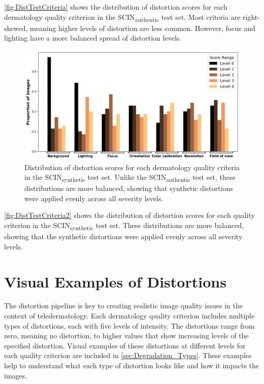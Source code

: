 \noindent
\clearpage
\autoref{fig:DistTestCriteria} shows the distribution of distortion scores for each dermatology quality criterion in the SCIN\textsubscript{authentic} test set. Most criteria are right-skewed, meaning higher levels of distortion are less common. However, focus and lighting have a more balanced spread of distortion levels.\par
\begin{figure}[ht]
    \centering
    \includegraphics[keepaspectratio,width=15cm]{img/Distribution_test_criteria2.png}
    \caption{Distribution of distortion scores for each dermatology quality criteria in the SCIN\textsubscript{synthetic} test set. Unlike the SCIN\textsubscript{authentic} test set, these distributions are more balanced, showing that synthetic distortions were applied evenly across all severity levels.}
    \label{fig:DistTestCriteria2}
\end{figure}
\noindent
\autoref{fig:DistTestCriteria2} shows the distribution of distortion scores for each quality criterion in the SCIN\textsubscript{synthetic} test set. These distributions are more balanced, showing that the synthetic distortions were applied evenly across all severity levels. \par

\section{Visual Examples of Distortions}
\label{sec:DistPipeline}
The distortion pipeline is key to creating realistic image quality issues in the context of teledermatology. Each dermatology quality criterion includes multiple types of distortions, each with five levels of intensity. The distortions range from zero, meaning no distortion, to higher values that show increasing levels of the specified distortion. Visual examples of these distortions at different levels for each quality criterion are included in \autoref{sec:Degradation_Types}. These examples help to understand what each type of distortion looks like and how it impacts the images. \par

